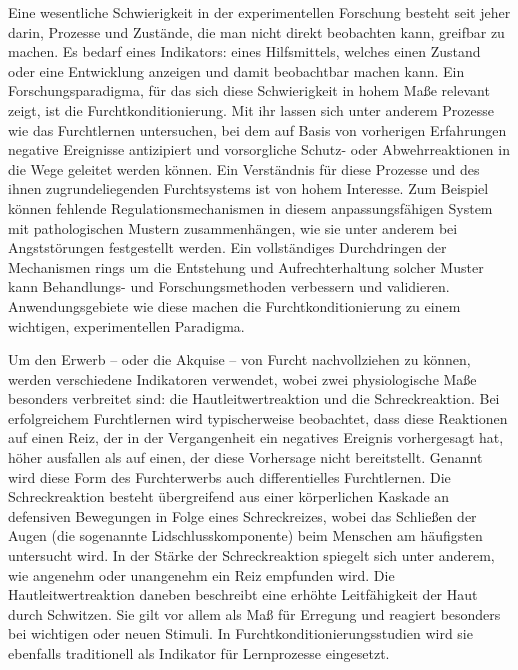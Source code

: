 

	Eine wesentliche Schwierigkeit in der experimentellen Forschung besteht seit jeher darin, Prozesse und Zustände, die man nicht direkt beobachten kann, greifbar zu machen. Es bedarf eines Indikators: eines Hilfsmittels, welches einen Zustand oder eine Entwicklung anzeigen und damit beobachtbar machen kann.  %
	Ein Forschungsparadigma, für das sich diese Schwierigkeit in hohem Maße relevant zeigt, ist die Furchtkonditionierung. Mit ihr lassen sich unter anderem Prozesse wie das Furchtlernen untersuchen, bei dem auf Basis von vorherigen Erfahrungen negative Ereignisse antizipiert und vorsorgliche Schutz- oder Abwehrreaktionen in die Wege geleitet werden können. 
	Ein Verständnis für diese Prozesse und des ihnen zugrundeliegenden Furchtsystems ist von hohem Interesse. Zum Beispiel können fehlende Regulationsmechanismen in diesem anpassungsfähigen System mit pathologischen Mustern zusammenhängen, wie sie unter anderem bei Angststörungen festgestellt werden. Ein vollständiges Durchdringen der Mechanismen rings um die Entstehung und Aufrechterhaltung solcher Muster kann Behandlungs- und Forschungsmethoden verbessern und validieren.
	Anwendungsgebiete wie diese machen die Furchtkonditionierung zu einem wichtigen, experimentellen Paradigma.
	
	Um den Erwerb -- oder die Akquise -- von Furcht nachvollziehen zu können, werden verschiedene Indikatoren verwendet, wobei zwei physiologische Maße besonders verbreitet sind: die Hautleitwertreaktion und die Schreckreaktion. Bei erfolgreichem Furchtlernen wird typischerweise beobachtet, dass diese Reaktionen auf einen Reiz, der in der Vergangenheit ein negatives Ereignis vorhergesagt hat, höher ausfallen als auf einen, der diese Vorhersage nicht bereitstellt. Genannt wird diese Form des Furchterwerbs auch differentielles Furchtlernen.  
	Die Schreckreaktion besteht übergreifend aus einer körperlichen Kaskade an defensiven Bewegungen in Folge eines Schreckreizes, wobei das Schließen der Augen (die sogenannte Lidschlusskomponente) beim Menschen am häufigsten untersucht wird. In der Stärke der Schreckreaktion spiegelt sich unter anderem, wie angenehm oder unangenehm ein Reiz empfunden wird.
	Die Hautleitwertreaktion daneben beschreibt eine erhöhte Leitfähigkeit der Haut durch Schwitzen. Sie gilt vor allem als Maß für Erregung und reagiert besonders bei wichtigen oder neuen Stimuli. In Furchtkonditionierungsstudien wird sie ebenfalls traditionell als Indikator für Lernprozesse eingesetzt. 

